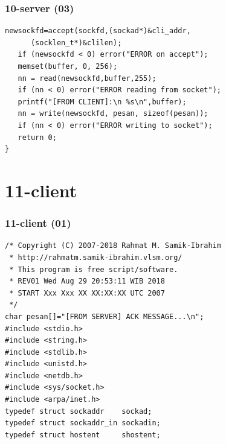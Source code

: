 \documentclass[aspectratio=169, xcolor=table, notheorems, hyperref={pdfpagelabels=false}]{beamer}
\begin{document}
\begin{frame}[fragile]
\frametitle{10-server (03)}
\begin{lstlisting}[basicstyle=\ttfamily\footnotesize]
   newsockfd=accept(sockfd,(sockad*)&cli_addr,
      (socklen_t*)&clilen);
   if (newsockfd < 0) error("ERROR on accept");
   memset(buffer, 0, 256);
   nn = read(newsockfd,buffer,255);
   if (nn < 0) error("ERROR reading from socket");
   printf("[FROM CLIENT]:\n %s\n",buffer);
   nn = write(newsockfd, pesan, sizeof(pesan));
   if (nn < 0) error("ERROR writing to socket");
   return 0;
}

\end{lstlisting}
\end{frame}

\section{11-client}
\begin{frame}[fragile]
\frametitle{11-client (01)}
\begin{lstlisting}[basicstyle=\ttfamily\small]
/* Copyright (C) 2007-2018 Rahmat M. Samik-Ibrahim
 * http://rahmatm.samik-ibrahim.vlsm.org/
 * This program is free script/software.
 * REV01 Wed Aug 29 20:53:11 WIB 2018
 * START Xxx Xxx XX XX:XX:XX UTC 2007
 */
char pesan[]="[FROM SERVER] ACK MESSAGE...\n";
#include <stdio.h>
#include <string.h>
#include <stdlib.h>
#include <unistd.h>
#include <netdb.h>
#include <sys/socket.h>
#include <arpa/inet.h>
typedef struct sockaddr    sockad;
typedef struct sockaddr_in sockadin;
typedef struct hostent     shostent;

\end{lstlisting}
\end{frame}
\end{document}

